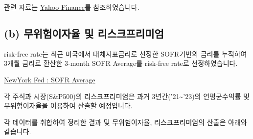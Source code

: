 \documentclass[
  a4paper,
  DIV=11,
  numbers=noendperiod]{scrreprt}
\begin{document}
관련 자료는 \href{https://finance.yahoo.com/}{Yahoo Finance}를
참조하였습니다.

\subsection*{(b) 무위험이자율 및
리스크프리미엄}\label{b-uxbb34uxc704uxd5d8uxc774uxc790uxc728-uxbc0f-uxb9acuxc2a4uxd06cuxd504uxb9acuxbbf8uxc5c4}

risk-free rate는 최근 미국에서 대체지표금리로 선정한 SOFR기반의 금리를
누적하여 3개월 금리로 환산한 3-month SOFR Average를 risk-free rate로
선정하였습니다.

\href{https://www.newyorkfed.org/markets/reference-rates/sofr-averages-and-index}{NewYork
Fed : SOFR Average}

각 주식과 시장(S\&P500)의 리스크프리미엄은 과거
3년간('21\textasciitilde'23)의 연평균수익률 및 무위험이자율을 이용하여
산출할 예정입니다.

각 데이터를 취합하여 정리한 결과 및 무위험이자율, 리스크프리미엄의
산출은 아래와 같습니다.
\end{document}
